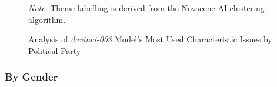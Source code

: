 \documentclass{article}
\begin{document}
\begin{figure}[H]
\centering
{}
\caption{Analysis of \textit{davinci-003} Model's Most Used Characteristic Issues by Political Party}
\begin{minipage}{0.7\textwidth}
\footnotesize \textit{Note}: Theme labelling is derived from the Novacene AI clustering algorithm.
\label{byparty}
\end{minipage}
\end{figure}

\subsubsection{By Gender}
\end{document}
